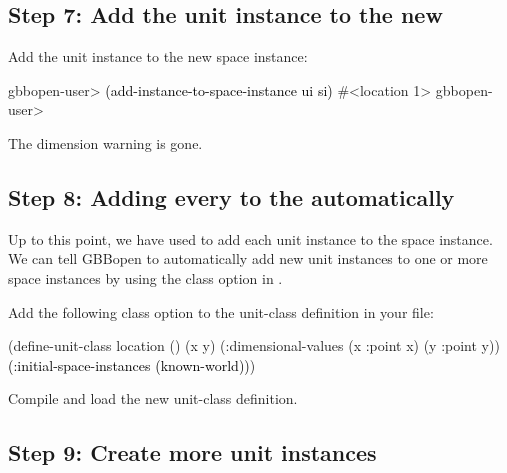 \documentclass[10pt,twoside,english,pdftex]{article}
\begin{document}
\subsection*{Step 7: Add the  unit instance to the new
  }

%
%
Add the  unit instance to the new 
space instance:
%
\W\supp
\begin{example}
\textcolor{darkergray}{%
  gbbopen-user> \textcolor{black}{(add-instance-to-space-instance ui si)}
  #<location 1>
  gbbopen-user>}
\end{example}
%
The dimension warning is gone.

\subsection*{Step 8: Adding every  to the 
  automatically}

Up to this point, we have used 
to add each  unit instance to the
 space instance.  We can tell GBBopen to
automatically add new unit instances to one or more space instances by using
the  class option in
.

%
%
Add the following  class option to the
 unit-class definition in your
 file:
%
\W\supp
\begin{example}
\textcolor{darkergray}{%
  (define-unit-class location ()
    (x y)
    (:dimensional-values
      (x :point x)
      (y :point y))
    \textcolor{black}{(:initial-space-instances (known-world))})}
\end{example}

Compile and load the new  unit-class definition.

\subsection*{Step 9: Create more  unit instances}
\end{document}
